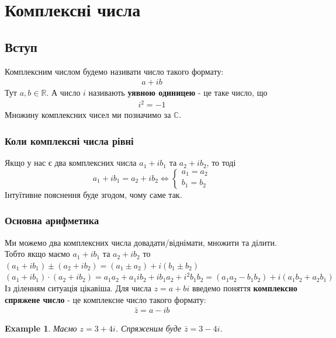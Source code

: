\documentclass[a4paper, 10pt]{article}
\theoremstyle{theoremdd}
\theoremstyle{theoremdd}
\theoremstyle{theoremdd}
\theoremstyle{theoremdd}
\newtheorem{example}[theorem]{Example}
\theoremstyle{theoremdd}
\theoremstyle{theoremdd}
\theoremstyle{theoremdd}
\theoremstyle{theoremdd}
\begin{document}
\tableofcontents
\newpage
	
\section{Комплексні числа}
\subsection{Вступ}
Комплексним числом будемо називати число такого формату:
\begin{align*}
a + ib
\end{align*}
Тут $a,b \in \mathbb{R}$. А число $i$ називають \textbf{уявною одиницею} - це таке число, що
\begin{align*}
i^2 = -1
\end{align*}
Множину комплексних чисел ми позначимо за $\mathbb{C}$.

\subsubsection*{Коли комплексні числа рівні}
Якщо у нас є два комплексних числа $a_1 + ib_1$ та $a_2 + ib_2$, то тоді
$$a_1 + ib_1 = a_2 + ib_2 \iff \begin{cases} a_1 = a_2 \\ b_1 = b_2 \end{cases}$$
Інтуїтивне пояснення буде згодом, чому саме так.

\subsubsection*{Основна арифметика}
Ми можемо два комплексних числа довадати/віднімати, множити та ділити. Тобто якщо маємо $a_1 + ib_1$ та $a_2 + ib_2$ то\\
$(a_1+ib_1) \pm (a_2 + ib_2) = (a_1 \pm a_2) + i(b_1 \pm b_2)$
\bigskip \\
$(a_1+ib_1) \cdot (a_2 + ib_2) = a_1 a_2 + a_1 i b_2 + ib_1 a_2 + i^2 b_1 b_2 = (a_1a_2-b_1b_2) + i(a_1b_2+a_2b_1)$
\bigskip \\
Із діленням ситуація цікавіша. Для числа $z = a+bi$ введемо поняття \textbf{комплексно спряжене число} - це комплексне число такого формату:
\begin{align*}
\bar{z} = a - ib
\end{align*}

\begin{example}
Маємо $z = 3 + 4i$. Спряженим буде $\bar{z} = 3 - 4i$.
\end{example}
\end{document}
